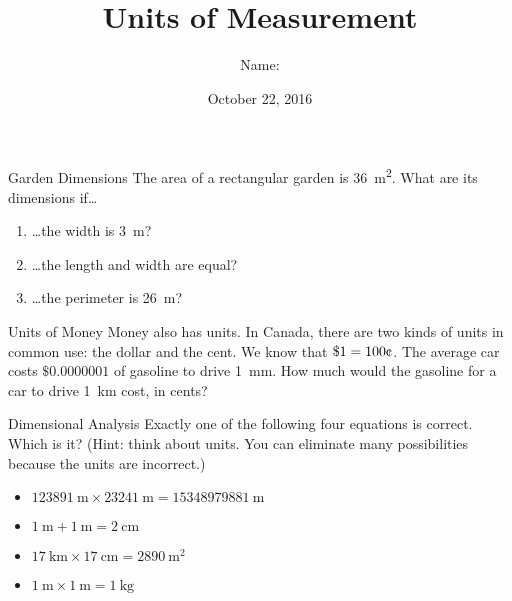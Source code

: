 \documentclass[14pt,letterpaper]{article}
\title{Units of Measurement}
\author{Name: \underline{\hspace{5cm}}}
\date{October 22, 2016}
\begin{document}
\HomeworkTitle

\thispagestyle{empty}

\begin{problem}{Garden Dimensions}
 The area of a rectangular garden is \SI{36}{\metre\squared}. What are its
 dimensions if\ldots

 \begin{enumerate}[\hspace{1cm}a.]
   \item \ldots{}the width is \SI{3}{\metre}?
   \item \ldots{}the length and width are equal?
   \item \ldots{}the perimeter is \SI{26}{\metre}?
 \end{enumerate}
\end{problem}

\begin{problem}{Units of Money}
  Money also has units. In Canada, there are two kinds of units in common use:
  the dollar and the cent. We know that $\$1=100\text{\textcent}$. The average
  car costs $\$0.0000001$ of gasoline to drive \SI{1}{\milli\metre}. How much
  would the gasoline for a car to drive \SI{1}{\kilo\metre} cost, in cents?
  \hfill \blankC\textcent
\end{problem}

\begin{problem}{Dimensional Analysis}
  Exactly one of the following four equations is correct. Which is it? (Hint:
  think about units. You can eliminate many possibilities because the units
  are incorrect.)

  \begin{itemize}
    \item \(\SI{123891}{\metre} \times \SI{23241}{\metre}
    = \SI{15348979881}{\metre}\)
    \item \(\SI{1}{\metre} + \SI{1}{\metre} = \SI{2}{\centi\metre}\)
    \item \(\SI{17}{\kilo\metre} \times \SI{17}{\centi\metre} =
    \SI{2890}{\metre\squared}\)
    \item \(\SI{1}{\metre} \times \SI{1}{\metre} = \SI{1}{\kilo\gram}\)
  \end{itemize}
\end{problem}
\end{document}
